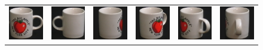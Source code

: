\begin{figure}[p]
\begin{center}
\begin{tabular}{cccccc}
\includegraphics[width=2cm]{coil/beeld-36.eps} &
\includegraphics[width=2cm]{coil/beeld-37.eps} &
\includegraphics[width=2cm]{coil/beeld-38.eps} &
\includegraphics[width=2cm]{coil/beeld-39.eps} &
\includegraphics[width=2cm]{coil/beeld-40.eps} &
\includegraphics[width=2cm]{coil/beeld-41.eps} \\


\end{tabular}
\end{center}
\end{figure}
